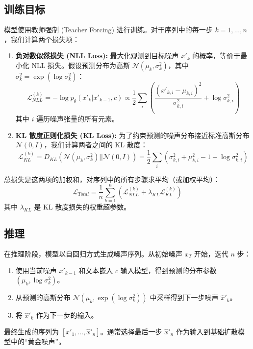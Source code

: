\documentclass{article}
\begin{document}
\subsection{训练目标}
模型使用教师强制 (Teacher Forcing) 进行训练。对于序列中的每一步 $k=1, \dots, n$，我们计算两个损失项：

\begin{enumerate}
    \item \textbf{负对数似然损失 (NLL Loss):} 最大化观测到目标噪声 $x'_k$ 的概率，等价于最小化 NLL 损失。假设预测分布为高斯 $\mathcal{N}(\mu_k, \sigma^2_k)$，其中 $\sigma^2_k = \exp(\log \sigma^2_k)$：
        \begin{equation}
            \mathcal{L}_{NLL}^{(k)} = -\log p_\theta(x'_k | x'_{k-1}, c) \propto \frac{1}{2} \sum_{i} \left( \frac{(x'_{k,i} - \mu_{k,i})^2}{\sigma^2_{k,i}} + \log \sigma^2_{k,i} \right)
        \end{equation}
        其中 $i$ 遍历噪声张量的所有元素。

    \item \textbf{KL 散度正则化损失 (KL Loss):} 为了约束预测的噪声分布接近标准高斯分布 $\mathcal{N}(0, I)$，我们计算两者之间的 KL 散度：
        \begin{equation}
            \mathcal{L}_{KL}^{(k)} = D_{KL}(\mathcal{N}(\mu_k, \sigma^2_k) || \mathcal{N}(0, I)) = \frac{1}{2} \sum_{i} (\sigma^2_{k,i} + \mu_{k,i}^2 - 1 - \log \sigma^2_{k,i})
        \end{equation}
\end{enumerate}

总损失是这两项的加权和，对序列中的所有步骤求平均（或加权平均）：
\begin{equation}
    \mathcal{L}_{Total} = \frac{1}{n} \sum_{k=1}^{n} (\mathcal{L}_{NLL}^{(k)} + \lambda_{KL} \mathcal{L}_{KL}^{(k)})
\end{equation}
其中 $\lambda_{KL}$ 是 KL 散度损失的权重超参数。

\subsection{推理}
在推理阶段，模型以自回归方式生成噪声序列。从初始噪声 $x_T$ 开始，迭代 $n$ 步：
\begin{enumerate}
    \item 使用当前噪声 $x'_{k-1}$ 和文本嵌入 $c$ 输入模型，得到预测的分布参数 $(\mu_k, \log \sigma^2_k)$。
    \item 从预测的高斯分布 $\mathcal{N}(\mu_k, \exp(\log \sigma^2_k))$ 中采样得到下一步噪声 $\hat{x}'_k$。
    \item 将 $\hat{x}'_k$ 作为下一步的输入。
\end{enumerate}
最终生成的序列为 $[\hat{x}'_1, \dots, \hat{x}'_n]$。通常选择最后一步 $\hat{x}'_n$ 作为输入到基础扩散模型中的“黄金噪声”。
\end{document}

